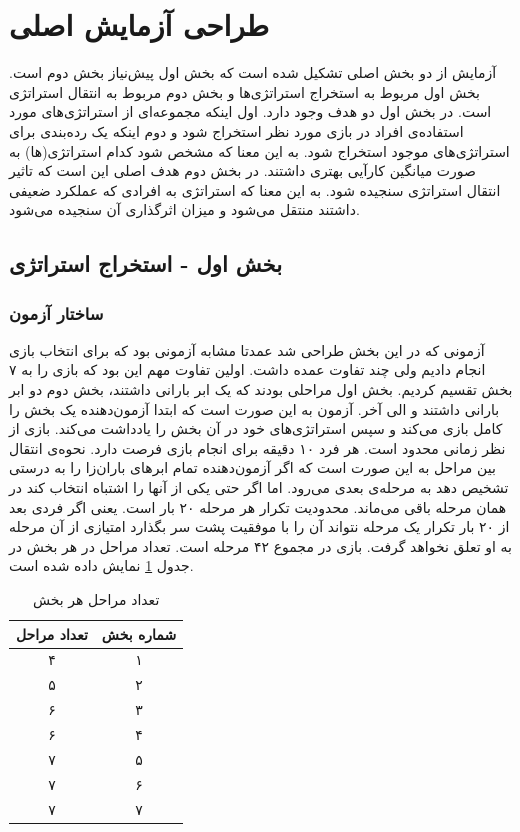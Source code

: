 \documentclass[twoside, a4paper,11pt]{book}
\numberwithin{equation}{chapter}
\numberwithin{table}{chapter}
\numberwithin{figure}{chapter}
\numberwithin{equation}{chapter}
\begin{document}
\section{طراحی آزمایش اصلی}
آزمایش از دو بخش اصلی تشکیل شده است که بخش اول پیش‌نیاز بخش دوم است. بخش اول مربوط به استخراج استراتژی‌ها و بخش دوم مربوط به انتقال استراتژی است. در بخش اول دو هدف وجود دارد. اول اینکه مجموعه‌ای از استراتژی‌های مورد استفاده‌ی افراد در بازی مورد نظر استخراج شود و دوم اینکه یک رده‌بندی برای استراتژی‌های موجود استخراج شود. به این معنا که مشخص شود کدام استراتژی‌(ها) به صورت میانگین کارآیی بهتری داشتند.
در بخش دوم هدف اصلی این است که تاثیر انتقال استراتژی سنجیده شود. به این معنا که استراتژی به افرادی که عملکرد ضعیفی داشتند منتقل می‌شود و میزان اثرگذاری آن سنجیده می‌شود.

\subsection{بخش اول - استخراج استراتژی}
\subsubsection{ساختار آزمون}
آزمونی که در این بخش طراحی شد عمدتا مشابه آزمونی بود که برای انتخاب بازی انجام دادیم ولی چند تفاوت عمده داشت. اولین تفاوت مهم این بود که بازی را به ۷ بخش تقسیم کردیم. بخش اول مراحلی بودند که یک ابر بارانی داشتند، بخش دوم دو ابر بارانی داشتند و الی آخر. آزمون به این صورت است که ابتدا آزمون‌دهنده یک بخش را کامل بازی می‌کند و سپس استراتژی‌های خود در آن بخش را یادداشت می‌کند. بازی از نظر زمانی محدود است. هر فرد ۱۰ دقیقه برای انجام بازی فرصت دارد. نحوه‌ی انتقال بین مراحل به این صورت است که اگر آزمون‌دهنده تمام ابرهای باران‌زا را به درستی تشخیص دهد به مرحله‌ی بعدی می‌رود. اما اگر حتی یکی از آنها را اشتباه انتخاب کند در همان مرحله باقی می‌ماند. محدودیت تکرار هر مرحله ۲۰ بار است. یعنی اگر فردی بعد از ۲۰ بار تکرار یک مرحله نتواند آن را با موفقیت پشت سر بگذارد امتیازی از آن مرحله به او تعلق نخواهد گرفت. بازی در مجموع ۴۲ مرحله است. تعداد مراحل در هر بخش در جدول \ref{numOfLevelTable} نمایش داده شده است.

\begin{table}[]
\centering
\caption{تعداد مراحل هر بخش}
\label{numOfLevelTable}
\begin{tabular}{|c|c|}
\hline
\textbf{تعداد مراحل} & \textbf{شماره بخش} \\ \hline
۴                    & ۱                  \\ \hline
۵                    & ۲                  \\ \hline
۶                    & ۳                  \\ \hline
۶                    & ۴                  \\ \hline
۷                    & ۵                  \\ \hline
۷                    & ۶                  \\ \hline
۷                    & ۷                  \\ \hline
\end{tabular}
\end{table}
\end{document}
